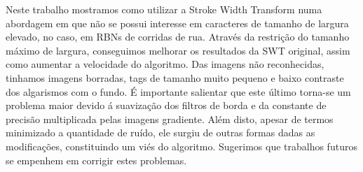 \documentclass[10pt,twocolumn,letterpaper]{article}
\begin{document}
Neste trabalho mostramos como utilizar a Stroke Width Transform numa abordagem em que n\~ao se possui interesse em caracteres 
de tamanho de largura elevado, no caso, em RBNs de corridas de rua. Atrav\'es da restri\c{c}\~ao do tamanho m\'aximo de 
largura, conseguimos melhorar os resultados da SWT original, assim como aumentar a velocidade do algoritmo.
Das imagens n\~ao reconhecidas, tinhamos imagens borradas, tags de tamanho muito pequeno e baixo contraste dos algarismos 
com o fundo. \'E importante salientar que este \'ultimo torna-se um problema maior devido \'a suaviza\c{c}\~ao dos filtros 
de borda e da constante de precis\~ao multiplicada pelas imagens gradiente. Al\'em disto, apesar de termos minimizado a 
quantidade de ru\'ido, ele surgiu de outras formas dadas as modifica\c{c}\~oes, constituindo um vi\'es do algoritmo. 
Sugerimos que trabalhos futuros se empenhem em corrigir estes problemas.
 
 
{\small


}
\end{document}
